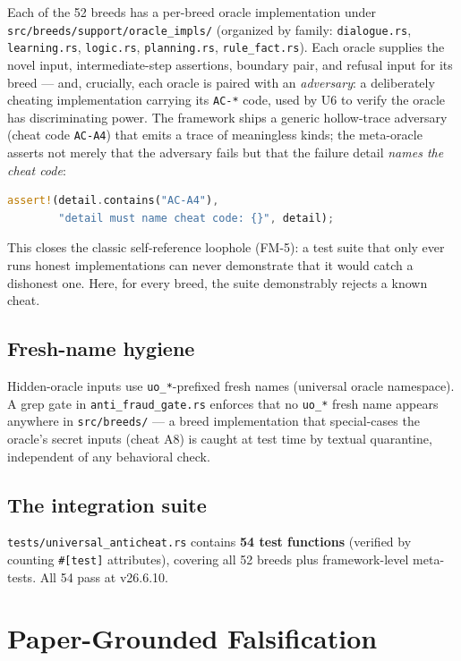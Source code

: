 \documentclass[11pt,oneside]{report}
\newcommand{\projver}{v26.6.10}
\begin{document}
Each of the 52 breeds has a per-breed oracle implementation under
\texttt{src/breeds/support/oracle\_impls/} (organized by family:
\texttt{dialogue.rs}, \texttt{learning.rs}, \texttt{logic.rs},
\texttt{planning.rs}, \texttt{rule\_fact.rs}). Each oracle supplies the
novel input, intermediate-step assertions, boundary pair, and refusal input
for its breed --- and, crucially, each oracle is paired with an
\emph{adversary}: a deliberately cheating implementation carrying its
\texttt{AC-*} code, used by U6 to verify the oracle has discriminating
power. The framework ships a generic hollow-trace adversary (cheat code
\texttt{AC-A4}) that emits a trace of meaningless kinds; the meta-oracle
asserts not merely that the adversary fails but that the failure detail
\emph{names the cheat code}:

\begin{lstlisting}[language=Rust]
assert!(detail.contains("AC-A4"),
        "detail must name cheat code: {}", detail);
\end{lstlisting}

This closes the classic self-reference loophole (FM-5): a test suite that
only ever runs honest implementations can never demonstrate that it would
catch a dishonest one. Here, for every breed, the suite demonstrably
rejects a known cheat.

\section{Fresh-name hygiene}

Hidden-oracle inputs use \texttt{uo\_*}-prefixed fresh names (universal
oracle namespace). A grep gate in \texttt{anti\_fraud\_gate.rs} enforces
that no \texttt{uo\_*} fresh name appears anywhere in \texttt{src/breeds/}
--- a breed implementation that special-cases the oracle's secret inputs
(cheat A8) is caught at test time by textual quarantine, independent of any
behavioral check.

\section{The integration suite}

\texttt{tests/universal\_anticheat.rs} contains \textbf{54 test
functions} (verified by counting \verb|#[test]| attributes), covering all
52 breeds plus framework-level meta-tests. All 54 pass at \projver{}.

\chapter{Paper-Grounded Falsification}
\label{ch:papers}
\end{document}

